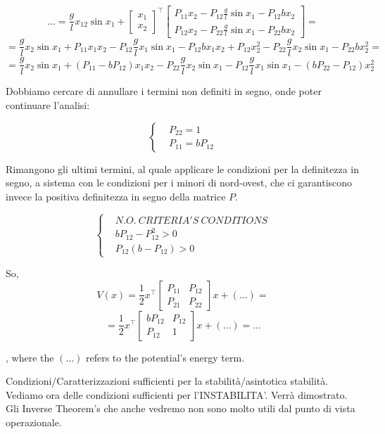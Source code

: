 \[
	\dots = \frac{g}{l}x_12\sin {x_1} + \begin{bmatrix}x_1\\x_2\end{bmatrix}^\top \begin{bmatrix}P_{11}x_2 - P_{12}\frac{g}{l}\sin{x_1}-P_{12}bx_2 \\ P_{12}x_2 - P_{22}\frac{g}{l}\sin{x_1}-P_{22}bx_2\end{bmatrix} =
\]
\[
	= \frac{g}{l}x_2\sin{x_1} + P_{11}x_1x_2 - P_{12}\frac{g}{l}x_1\sin{x_1} - P_{12}bx_1x_2 + P_{12}x_2^2 - P_{22}\frac{g}{l}x_2\sin{x_1} - P_{22}bx_2^2 =
\]
\[
	= \frac{g}{l}x_2\sin{x_1} + (P_{11}-bP_{12})x_1x_2 - P_{22}\frac{g}{l}x_2\sin{x_1} - P_{12}\frac{g}{l}x_1\sin{x_1} - (bP_{22}-P_{12})x_2^2
\]

Dobbiamo cercare di annullare i termini non definiti in segno, onde poter continuare l'analisi:

\[
	\left\{
	\begin{aligned}
	&P_{22} = 1 \\
	&P_{11} = bP_{12}
	\end{aligned} 
	\right.
\]

Rimangono gli ultimi termini, al quale applicare le condizioni per la definitezza in segno, a sistema con le condizioni per i minori di nord-ovest, che ci garantiscono invece la positiva definitezza in segno della matrice $P$.

\[
	\left\{
	\begin{aligned}
	&N.O.\ CRITERIA'S\ CONDITIONS \\
	&bP_{12} - P_{12}^2 > 0\\
	&P_{12}(b-P_{12}) > 0
	\end{aligned} 
	\right.
\]

So,
\[
	V(x) = \frac{1}{2}x^\top \begin{bmatrix}P_{11} & P_{12}\\P_{21} & P_{22}\end{bmatrix}x + (\dots) =
\]
\[
	= \frac{1}{2}x^\top \begin{bmatrix}bP_{12} & P_{12}\\P_{12} & 1\end{bmatrix}x + (\dots) = \dots
\]

, where the $(\dots)$ refers to the potential's energy term.

Condizioni/Caratterizzazioni sufficienti per la stabilità/asintotica stabilità. Vediamo ora delle condizioni sufficienti per l'INSTABILITA'. Verrà dimostrato. Gli Inverse Theorem's che anche vedremo non sono molto utili dal punto di vista operazionale.

